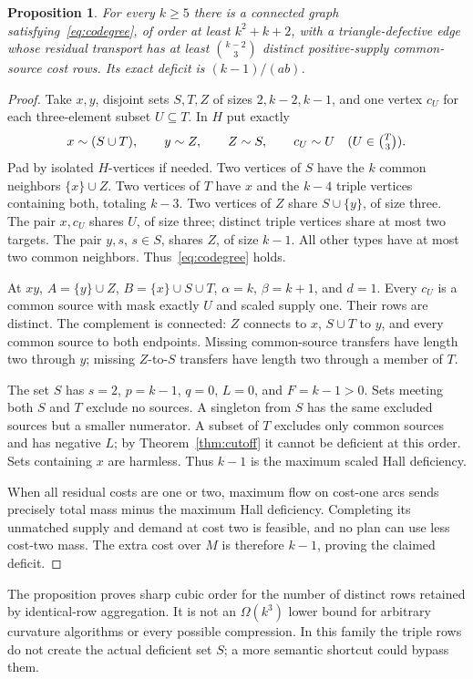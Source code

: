 \documentclass[11pt]{article}
\newtheorem{proposition}[theorem]{Proposition}
\theoremstyle{remark}
\begin{document}
\begin{proposition}\label{prop:cubic}
For every $k\ge5$ there is a connected graph satisfying~\eqref{eq:codegree}, of order at least $k^2+k+2$, with a triangle-defective edge whose residual transport has at least $\binom{k-2}{3}$ distinct positive-supply common-source cost rows. Its exact deficit is $(k-1)/(ab)$.
\end{proposition}
\begin{proof}
Take $x,y$, disjoint sets $S,T,Z$ of sizes $2,k-2,k-1$, and one vertex $c_U$ for each three-element subset $U\subseteq T$. In $H$ put exactly
\[
 x\mathrel{\sim}(S\cup T),\qquad y\mathrel{\sim}Z,\qquad Z\mathrel{\sim}S,
 \qquad c_U\mathrel{\sim}U\quad(U\in\tbinom T3).
\]
Pad by isolated $H$-vertices if needed. Two vertices of $S$ have the $k$ common neighbors $\{x\}\cup Z$. Two vertices of $T$ have $x$ and the $k-4$ triple vertices containing both, totaling $k-3$. Two vertices of $Z$ share $S\cup\{y\}$, of size three. The pair $x,c_U$ shares $U$, of size three; distinct triple vertices share at most two targets. The pair $y,s$, $s\in S$, shares $Z$, of size $k-1$. All other types have at most two common neighbors. Thus~\eqref{eq:codegree} holds.

At $xy$, $A=\{y\}\cup Z$, $B=\{x\}\cup S\cup T$, $\alpha=k$, $\beta=k+1$, and $d=1$. Every $c_U$ is a common source with mask exactly $U$ and scaled supply one. Their rows are distinct. The complement is connected: $Z$ connects to $x$, $S\cup T$ to $y$, and every common source to both endpoints. Missing common-source transfers have length two through $y$; missing $Z$-to-$S$ transfers have length two through a member of $T$.

The set $S$ has $s=2$, $p=k-1$, $q=0$, $L=0$, and $F=k-1>0$. Sets meeting both $S$ and $T$ exclude no sources. A singleton from $S$ has the same excluded sources but a smaller numerator. A subset of $T$ excludes only common sources and has negative $L$; by Theorem~\ref{thm:cutoff} it cannot be deficient at this order. Sets containing $x$ are harmless. Thus $k-1$ is the maximum scaled Hall deficiency.

When all residual costs are one or two, maximum flow on cost-one arcs sends precisely total mass minus the maximum Hall deficiency. Completing its unmatched supply and demand at cost two is feasible, and no plan can use less cost-two mass. The extra cost over $M$ is therefore $k-1$, proving the claimed deficit.
\end{proof}

The proposition proves sharp cubic order for the number of distinct rows retained by identical-row aggregation. It is not an $\Omega(k^3)$ lower bound for arbitrary curvature algorithms or every possible compression. In this family the triple rows do not create the actual deficient set $S$; a more semantic shortcut could bypass them.
\end{document}
